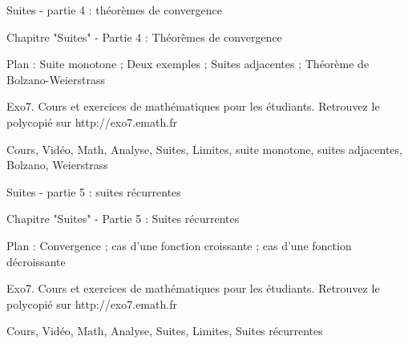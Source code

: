 Suites - partie 4 : théorèmes de convergence



Chapitre "Suites" - Partie 4 : Théorèmes de convergence

Plan : Suite monotone ; Deux exemples ; Suites adjacentes ; Théorème de Bolzano-Weierstrass

Exo7. Cours et exercices de mathématiques pour les étudiants.
Retrouvez le polycopié sur http://exo7.emath.fr


Cours, Vidéo, Math, Analyse, Suites, Limites, suite monotone, suites adjacentes, Bolzano, Weierstrass


Suites - partie 5 : suites récurrentes



Chapitre "Suites" - Partie 5 : Suites récurrentes

Plan : Convergence ; cas d'une fonction croissante ; cas d'une fonction décroissante

Exo7. Cours et exercices de mathématiques pour les étudiants.
Retrouvez le polycopié sur http://exo7.emath.fr


Cours, Vidéo, Math, Analyse, Suites, Limites, Suites récurrentes




